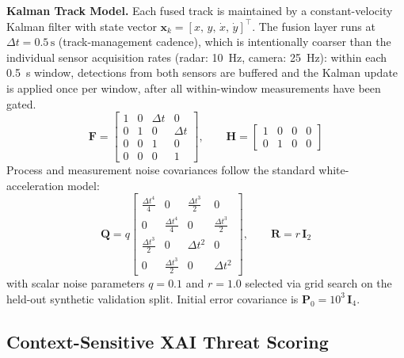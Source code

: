 \documentclass[drones,article,submit,pdftex]{Definitions/mdpi}
\begin{document}
\textbf{Kalman Track Model.}
Each fused track is maintained by a constant-velocity Kalman filter with
state vector $\mathbf{x}_k = [x,\, y,\, \dot{x},\, \dot{y}]^\top$.
The fusion layer runs at $\Delta t = 0.5\,\text{s}$ (track-management cadence),
which is intentionally coarser than the individual sensor acquisition rates
(radar: 10~Hz, camera: 25~Hz): within each 0.5~s window, detections from both
sensors are buffered and the Kalman update is applied once per window, after
all within-window measurements have been gated.
\begin{equation}
  \mathbf{F} = \begin{bmatrix}
    1 & 0 & \Delta t & 0 \\
    0 & 1 & 0        & \Delta t \\
    0 & 0 & 1        & 0 \\
    0 & 0 & 0        & 1
  \end{bmatrix}, \qquad
  \mathbf{H} = \begin{bmatrix}
    1 & 0 & 0 & 0 \\
    0 & 1 & 0 & 0
  \end{bmatrix}
  \label{eq:kalman_FH}
\end{equation}
Process and measurement noise covariances follow the standard white-acceleration
model:
\begin{equation}
  \mathbf{Q} = q \begin{bmatrix}
    \tfrac{\Delta t^4}{4} & 0 & \tfrac{\Delta t^3}{2} & 0 \\
    0 & \tfrac{\Delta t^4}{4} & 0 & \tfrac{\Delta t^3}{2} \\
    \tfrac{\Delta t^3}{2} & 0 & \Delta t^2 & 0 \\
    0 & \tfrac{\Delta t^3}{2} & 0 & \Delta t^2
  \end{bmatrix}, \qquad
  \mathbf{R} = r\,\mathbf{I}_2
  \label{eq:kalman_QR}
\end{equation}
with scalar noise parameters $q = 0.1$ and $r = 1.0$ selected via
grid search on the held-out synthetic validation split.
Initial error covariance is $\mathbf{P}_0 = 10^3\,\mathbf{I}_4$.

\subsection{Context-Sensitive XAI Threat Scoring}
\label{sec:xai}
\end{document}
